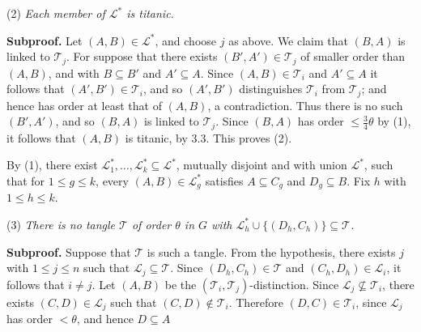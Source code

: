 \hspace*{12pt}(2) \textit{Each member of $\mathscr{L}^*$ is titanic.}

\textbf{Subproof.} Let $(A, B) \in \mathscr{L}^*$, and choose $j$ as above. We claim that $(B, A)$ is linked to $\mathscr{T}_j$. For suppose that there exists $(B', A') \in \mathscr{T}_j$ of smaller order than $(A, B)$, and with $B \subseteq B'$ and $A' \subseteq A$. Since $(A, B) \in \mathscr{T}_i$ and $A' \subseteq A$ it follows that $(A', B') \in \mathscr{T}_i$, and so $(A', B')$ distinguishes $\mathscr{T}_i$ from $\mathscr{T}_j$; and hence has order at least that of $(A, B)$, a contradiction. Thus there is no such $(B', A')$, and so $(B, A)$ is linked to $\mathscr{T}_j$. Since $(B, A)$ has order $\le \frac{3}{4}\theta$ by (1), it follows that $(A, B)$ is titanic, by 3.3. This proves (2).

By (1), there exist $\mathscr{L}_1^*, \dots, \mathscr{L}_k^* \subseteq \mathscr{L}^*$, mutually disjoint and with union $\mathscr{L}^*$, such that for $1 \le g \le k$, every $(A, B) \in \mathscr{L}_g^*$ satisfies $A \subseteq C_g$ and $D_g \subseteq B$. Fix $h$ with $1 \le h \le k$.

\hspace*{12pt}(3) \textit{There is no tangle $\mathscr{T}$ of order $\theta$ in $G$ with $\mathscr{L}_h^* \cup \{(D_h, C_h)\} \subseteq \mathscr{T}$.}

\textbf{Subproof.} Suppose that $\mathscr{T}$ is such a tangle. From the hypothesis, there exists $j$ with $1 \le j \le n$ such that $\mathscr{L}_j \subseteq \mathscr{T}$. Since $(D_h, C_h) \in \mathscr{T}$ and $(C_h, D_h) \in \mathscr{L}_i$, it follows that $i \ne j$. Let $(A, B)$ be the $(\mathscr{T}_i, \mathscr{T}_j)$-distinction. Since $\mathscr{L}_j \nsubseteq \mathscr{T}_i$, there exists $(C, D) \in \mathscr{L}_j$ such that $(C, D) \notin \mathscr{T}_i$. Therefore $(D, C) \in \mathscr{T}_i$, since $\mathscr{L}_j$ has order $<\theta$, and hence $D \subseteq A$
